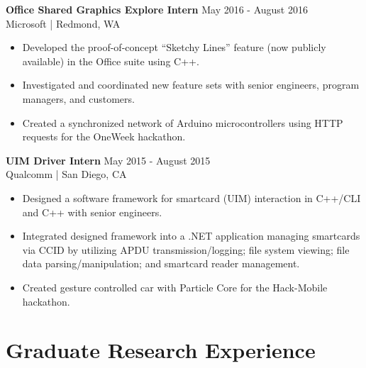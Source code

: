 \documentclass[line]{res}
\begin{document}
\begin{resume}
\vspace{-2mm}

\textbf{Office Shared Graphics Explore Intern} \hfill May 2016 - August 2016
\\
Microsoft | Redmond, WA
\\
\vspace{-3mm}
\begin{itemize}
\item Developed the proof-of-concept ``Sketchy Lines'' feature (now publicly available) in the Office suite using C++.
\item Investigated and coordinated new feature sets with senior engineers, program managers, and customers.
\item Created a synchronized network of Arduino microcontrollers using HTTP requests for the OneWeek hackathon.
\end{itemize}

\vspace{-2mm}

\textbf{UIM Driver Intern} \hfill May 2015 - August 2015
\\
Qualcomm | San Diego, CA
\\
\vspace{-3mm}
\begin{itemize}
\item Designed a software framework for smartcard (UIM) interaction in C++/CLI and C++ with senior engineers.
\item Integrated designed framework into a .NET application managing smartcards via CCID by utilizing APDU transmission/logging; file system viewing; file data parsing/manipulation; and smartcard reader management.
\item Created gesture controlled car with Particle Core for the Hack-Mobile hackathon.
\end{itemize}

\pagebreak

\section{\Large{Graduate Research Experience}}
\label{sec:gradexp}
\vspace{2mm}


\end{resume}
\end{document}
